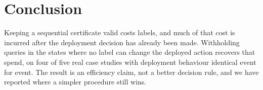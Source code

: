\documentclass{article}
\begin{document}
\section{Conclusion}
Keeping a sequential certificate valid costs labels, and much of that cost is incurred after the
deployment decision has already been made. Withholding queries in the states where no label can
change the deployed action recovers that spend, on four of five real case studies with deployment
behaviour identical event for event. The result is an efficiency claim, not a better decision
rule, and we have reported where a simpler procedure still wins.



\end{document}
